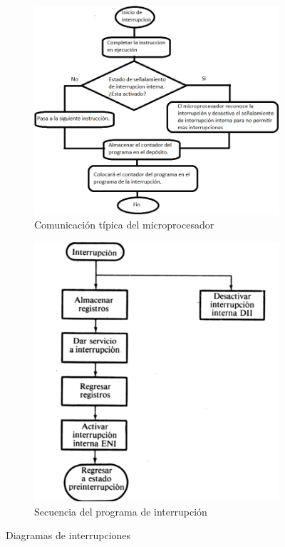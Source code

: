 \documentclass[12pt, letter]{article}
\begin{document}
\begin{figure}[h!] %
    \raggedright
        \begin{subfigure}[b]{0.45\linewidth}
            \includegraphics[width=0.8\linewidth]{Figuras/diagrama1.png}
            \caption{Comunicación típica del microprocesador}
            \label{fig:diagrama1}
        \end{subfigure}
    \raggedleft
        \begin{subfigure}[b]{0.45\linewidth}
            \includegraphics[width=0.8\linewidth]{Figuras/diagrama2.png}
            \caption{Secuencia del programa de interrupción}
            \label{fig:diagrama2}
        \end{subfigure}
    \caption{Diagramas de interrupciones}
    \label{fig:Diagramas}
\end{figure}
\end{document}
